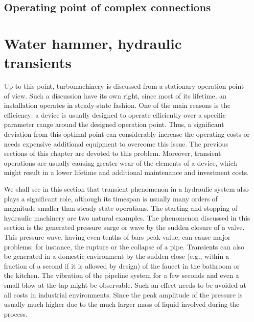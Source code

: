 \subsection{Operating point of complex connections} \label{sec:operation_point_complex_connections}



\section{Water hammer, hydraulic transients}

Up to this point, turbomachinery is discussed from a stationary operation point of view. Such a discussion have its own right, since most of its lifetime, an installation operates in steady-state fashion. One of the main reasons is the efficiency: a device is usually designed to operate efficiently over a specific parameter range around the designed operation point. Thus, a significant deviation from this optimal point can considerably increase the operating costs or needs expensive additional equipment to overcome this issue. The previous sections of this chapter are devoted to this problem. Moreover, transient operations are usually causing greater wear of the elements of a device, which might result in a lower lifetime and additional maintenance and investment costs.

We shall see in this section that transient phenomenon in a hydraulic system also plays a significant role, although its timespan is usually many orders of magnitude smaller than steady-state operations. The starting and stopping of hydraulic machinery are two natural examples. The phenomenon discussed in this section is the generated pressure surge or wave by the sudden closure of a valve. This pressure wave, having even tenths of bars peak value, can cause major problems; for instance, the rupture or the collapse of a pipe. Transients can also be generated in a domestic environment by the sudden close (e.g., within a fraction of a second if it is allowed by design) of the faucet in the bathroom or the kitchen. The vibration of the pipeline system for a few seconds and even a small blow at the tap might be observable. Such an effect needs to be avoided at all costs in industrial environments. Since the peak amplitude of the pressure is usually much higher due to the much larger mass of liquid involved during the process.


